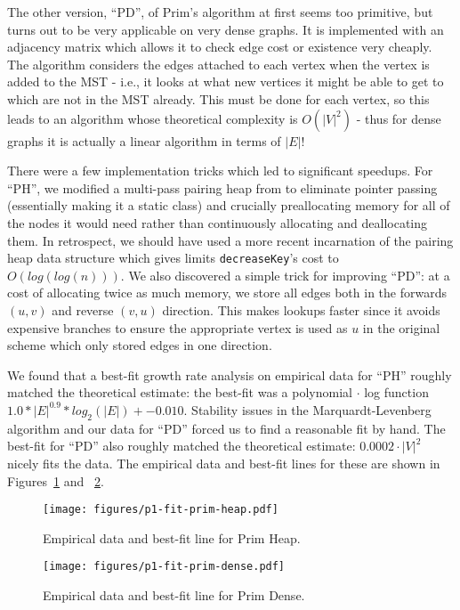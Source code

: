 The other version, ``PD'', of Prim's algorithm at first seems too primitive, but
turns out to be very applicable on very dense graphs.  It is implemented with an
adjacency matrix which allows it to check edge cost or existence very cheaply.
The algorithm considers the edges attached to each vertex when the vertex is
added to the MST - i.e., it looks at what new vertices it might be able to get
to which are not in the MST already.  This must be done for each vertex, so this
leads to an algorithm whose theoretical complexity is $O(|V|^2)$ - thus for
dense graphs it is actually a linear algorithm in terms of $|E|$!

There were a few implementation tricks which led to significant speedups.  For
``PH'', we modified a multi-pass pairing heap from \cite{rui} to eliminate
pointer passing (essentially making it a static class) and crucially
preallocating memory for all of the nodes it would need rather than continuously
allocating and deallocating them.  In retrospect, we should have used a more
recent incarnation of the pairing heap data structure which gives limits
\texttt{decreaseKey}'s cost to $O(log(log(n)))$\cite{elmasry}.  We also
discovered a simple trick for improving ``PD'': at a cost of allocating twice as
much memory, we store all edges both in the forwards $(u, v)$ and reverse $(v,
u)$ direction.  This makes lookups faster since it avoids expensive branches to
ensure the appropriate vertex is used as $u$ in the original scheme which only
stored edges in one direction.

We found that a best-fit growth rate analysis on empirical data for ``PH''
roughly matched the theoretical estimate: the best-fit was a polynomial $\cdot$
log function $1.0 * |E|^{0.9} * log_2(|E|) + -0.010$.  Stability issues in the
Marquardt-Levenberg algorithm and our data for ``PD'' forced us to find a
reasonable fit by hand.  The best-fit for ``PD'' also roughly matched the
theoretical estimate: $0.0002 \cdot |V|^2$ nicely fits the data.  The empirical
data and best-fit lines for these are shown in
Figures~\ref{fig:p1-fit-prim-heap} and ~\ref{fig:p1-fit-prim-dense}.

\begin{figure}[htb]
\centering
\texttt{[image: figures/p1-fit-prim-heap.pdf]}
\caption{Empirical data and best-fit line for Prim Heap.}
\label{fig:p1-fit-prim-heap}
\end{figure}

\begin{figure}[htb]
\centering
\texttt{[image: figures/p1-fit-prim-dense.pdf]}
\caption{Empirical data and best-fit line for Prim Dense.}
\label{fig:p1-fit-prim-dense}
\end{figure}

